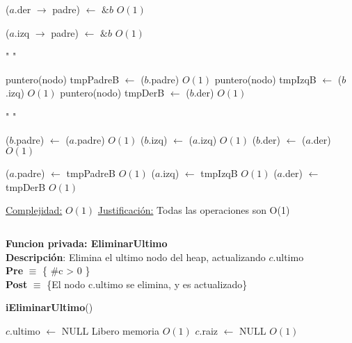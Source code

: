 \begin{Algoritmos}
\begin{algorithm}[H]
\begin{algorithmic}[1]
        \State ($a$.der $\to$ padre) $\gets$ $\&b$ \Comment $O(1)$
    \EndIf

        \State ($a$.izq $\to$ padre) $\gets$ $\&b$ \Comment $O(1)$
    \EndIf

    \State " "

    \State puntero(nodo) tmpPadreB $\gets$ ($b$.padre) \Comment $O(1)$
    \State puntero(nodo) tmpIzqB $\gets$ ($b$.izq) \Comment $O(1)$
    \State puntero(nodo) tmpDerB $\gets$ ($b$.der) \Comment $O(1)$

    \State " "

    \State ($b$.padre) $\gets$ ($a$.padre) \Comment $O(1)$
    \State ($b$.izq) $\gets$ ($a$.izq) \Comment $O(1)$
    \State ($b$.der) $\gets$ ($a$.der) \Comment $O(1)$

    \State ($a$.padre) $\gets$ tmpPadreB \Comment $O(1)$
    \State ($a$.izq) $\gets$ tmpIzqB \Comment $O(1)$
    \State ($a$.der) $\gets$ tmpDerB \Comment $O(1)$


    \medskip
    \Statex \underline{Complejidad:} $O(1)$
    \Statex \underline{Justificaci\'on:} Todas las operaciones son O(1)

\end{algorithmic}
\end{algorithm}

$ $\newline

\textbf{Funcion privada: EliminarUltimo}\\
\textbf{Descripci\'on}: Elimina el ultimo nodo del heap, actualizando $c$.ultimo\\
\textbf{Pre} $\equiv$ \{ $\#$c > 0 \}\\%
\textbf{Post} $\equiv$ \{El nodo c.ultimo se elimina, y es actualizado\}%
\begin{algorithm}[H]
{\textbf{iEliminarUltimo}()}
\begin{algorithmic}[1]

        \State $c$.ultimo $\gets$ NULL \Comment Libero memoria $O(1)$
        \State $c$.raiz $\gets$ NULL \Comment $O(1)$
    \Else


\end{algorithmic}
\end{algorithm}
\end{Algoritmos}
